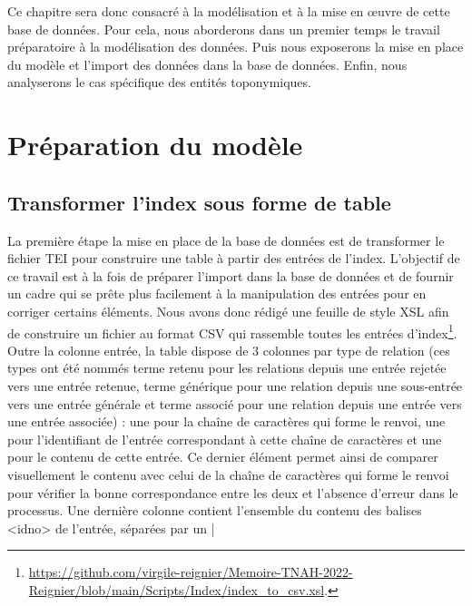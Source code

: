 \documentclass[a4paper,12pt,twoside]{book}
\begin{document}
	Ce chapitre sera donc consacré à la modélisation et à la mise en œuvre de cette base de données. Pour cela, nous aborderons dans un premier temps le travail préparatoire à la modélisation des données. Puis nous exposerons la mise en place du modèle et l'import des données dans la base de données. Enfin, nous analyserons le cas spécifique des entités toponymiques.
	
	\section{Préparation du modèle}
	
	\subsection{Transformer l'index sous forme de table}
	
	La première étape la mise en place de la base de données est de transformer le fichier TEI pour construire une table à partir des entrées de l'index. L'objectif de ce travail est à la fois de préparer l'import dans la base de données et de fournir un cadre qui se prête plus facilement à la manipulation des entrées pour en corriger certains éléments. Nous avons donc rédigé une feuille de style XSL afin de construire un fichier au format CSV qui rassemble toutes les entrées d'index\footnote{\url{https://github.com/virgile-reignier/Memoire-TNAH-2022-Reignier/blob/main/Scripts/Index/index_to_csv.xsl}.}. Outre la colonne \og entrée\fg{}, la table dispose de 3 colonnes par type de relation (ces types ont été nommés \og terme retenu\fg{} pour les relations depuis une entrée rejetée vers une entrée retenue, \og terme générique\fg{} pour une relation depuis une sous-entrée vers une entrée générale et \og terme associé\fg{} pour une relation depuis une entrée vers une entrée associée) : une pour la chaîne de caractères qui forme le renvoi, une pour l'identifiant de l'entrée correspondant à cette chaîne de caractères et une pour le contenu de cette entrée. Ce dernier élément permet ainsi de comparer visuellement le contenu avec celui de la chaîne de caractères qui forme le renvoi pour vérifier la bonne correspondance entre les deux et l'absence d'erreur dans le processus. Une dernière colonne contient l'ensemble du contenu des balises <idno> de l'entrée, séparées par un \og | \fg{}
	
\end{document}
